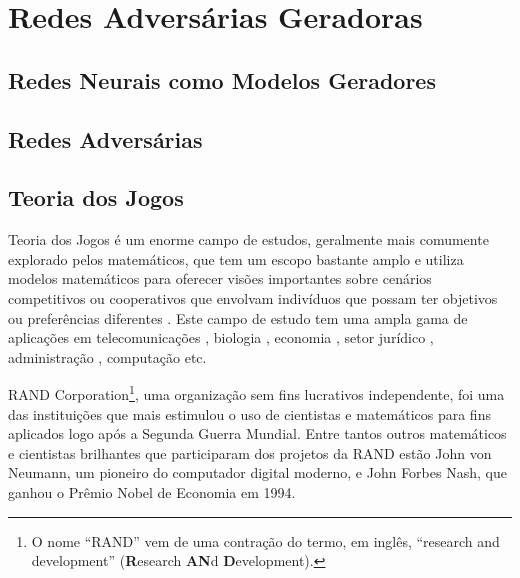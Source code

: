 \chapter{Redes Adversárias Geradoras}
\label{cha:gan}

\section{Redes Neurais como Modelos Geradores}
\label{sec:gan_nn_as_generative_model}



\section{Redes Adversárias}
\label{sec:gan_adversarial_nets}



\section{Teoria dos Jogos}
\label{sec:gan_game_theory}

Teoria dos Jogos é um enorme campo de estudos, geralmente mais comumente explorado pelos matemáticos, que tem um escopo bastante amplo e utiliza modelos matemáticos para oferecer visões importantes sobre cenários competitivos ou cooperativos que envolvam indivíduos que possam ter objetivos ou preferências diferentes \citep{myerson1997game}. Este campo de estudo tem uma ampla gama de aplicações em telecomunicações \citep{han2012game}, biologia \citep{smith1974theory}, economia \citep{Friedman1998, kreps1990game, gibbons1992game}, setor jurídico \citep{baird1998game}, administração \citep{sanfey2007social, camerer2011behavioral}, computação \citep{abraham2006distributed} etc.

RAND Corporation\footnote{O nome ``RAND'' vem de uma contração do termo, em inglês, ``research and development'' (\textbf{R}esearch \textbf{AN}d \textbf{D}evelopment).}, uma organização sem fins lucrativos independente, foi uma das instituições que mais estimulou o uso de cientistas e matemáticos para fins aplicados logo após a Segunda Guerra Mundial. Entre tantos outros matemáticos e cientistas brilhantes que participaram dos projetos da RAND estão John von Neumann, um pioneiro do computador digital moderno, e John Forbes Nash, que ganhou o Prêmio Nobel de Economia em 1994.

